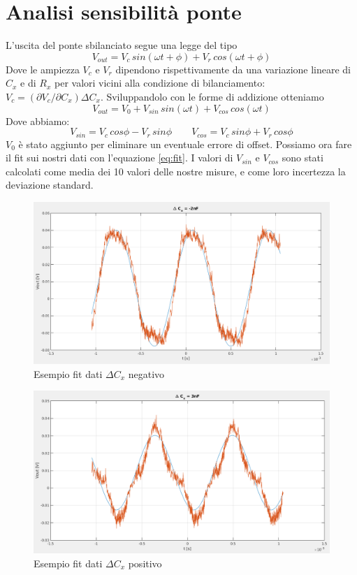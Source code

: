 \documentclass[12pt,]{article}
\begin{document}
\section{Analisi sensibilità ponte}
L'uscita del ponte sbilanciato segue una legge del tipo
\begin{equation}
\label{eq:gen}
V_{out} = V_c\, sin(\omega t + \phi) + V_r\, cos(\omega t + \phi)
\end{equation}
Dove le ampiezza $V_c$ e $V_r$ dipendono rispettivamente da una variazione lineare di $C_x$ e di $R_x$ per valori vicini alla condizione di bilanciamento: $V_c = (\partial V_c/\partial C_x) \Delta C_x$. Sviluppandolo con le forme di addizione otteniamo
\begin{equation}
\label{eq:fit}
V_{out}=V_0 + V_{sin}\, sin (\omega t) + V_{cos} \,cos(\omega t)
\end{equation}
Dove abbiamo:
\begin{equation}
V_{sin} = V_c\, cos\phi -V_r\, sin\phi \qquad V_{cos} = V_c\, sin\phi + V_r\, cos\phi
\end{equation}
$V_0$ è stato aggiunto per eliminare un eventuale errore di offset. Possiamo ora fare il fit sui nostri dati con l'equazione \eqref{eq:fit}.
I valori di $V_{sin}$ e $V_{cos}$ sono stati calcolati come media dei 10 valori delle nostre misure, e come loro incertezza la deviazione standard.
\begin{figure}[H]
\centering
\includegraphics[width=\textwidth]{fit1}
\caption{Esempio fit dati $\Delta C_x$ negativo}
\end{figure}
\begin{figure}[H]
\centering
\includegraphics[width=\textwidth]{fit2}
\caption{Esempio fit dati $\Delta C_x$ positivo}
\end{figure}
\end{document}
